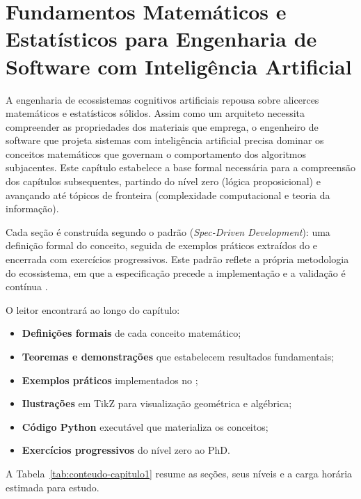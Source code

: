 \chapter{Fundamentos Matemáticos e Estatísticos para Engenharia de Software com Inteligência Artificial}
\label{cap:fundamentos-matematicos}

A engenharia de ecossistemas cognitivos artificiais repousa sobre alicerces
matemáticos e estatísticos sólidos. Assim como um arquiteto necessita
compreender as propriedades dos materiais que emprega, o engenheiro de software
que projeta sistemas com inteligência artificial precisa dominar os conceitos
matemáticos que governam o comportamento dos algoritmos subjacentes.
Este capítulo estabelece a base formal necessária para a compreensão dos
capítulos subsequentes, partindo do nível zero (lógica proposicional) e
avançando até tópicos de fronteira (complexidade computacional e teoria da
informação).

Cada seção é construída segundo o padrão \sdd{} (\textit{Spec-Driven
Development}): uma definição formal do conceito, seguida de exemplos práticos
extraídos do \opencodeeco{} e encerrada com exercícios progressivos.
Este padrão reflete a própria metodologia do ecossistema, em que a
especificação precede a implementação e a validação é contínua
\cite{beck2002tdd, pressman2016engenharia}.

O leitor encontrará ao longo do capítulo:
\begin{itemize}
    \item \textbf{Definições formais} de cada conceito matemático;
    \item \textbf{Teoremas e demonstrações} que estabelecem resultados
          fundamentais;
    \item \textbf{Exemplos práticos} implementados no \opencodeeco{};
    \item \textbf{Ilustrações} em TikZ para visualização geométrica e
          algébrica;
    \item \textbf{Código Python} executável que materializa os conceitos;
    \item \textbf{Exercícios progressivos} do nível zero ao PhD.
\end{itemize}

A Tabela~\ref{tab:conteudo-capitulo1} resume as seções, seus níveis e a
carga horária estimada para estudo.

